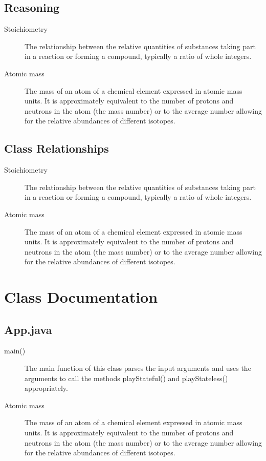 \documentclass{article}
\begin{document}
\subsection{Reasoning}
\label{Reasoning}
\begin{description}
\item[Stoichiometry]
The relationship between the relative quantities of substances taking part in a reaction or forming a compound, typically a ratio of whole integers.
\item[Atomic mass]
The mass of an atom of a chemical element expressed in atomic mass units. It is approximately equivalent to the number of protons and neutrons in the atom (the mass number) or to the average number allowing for the relative abundances of different isotopes. 
\end{description} 


\subsection{Class Relationships}
\label{Class Relationships}
\begin{description}
\item[Stoichiometry]
The relationship between the relative quantities of substances taking part in a reaction or forming a compound, typically a ratio of whole integers.
\item[Atomic mass]
The mass of an atom of a chemical element expressed in atomic mass units. It is approximately equivalent to the number of protons and neutrons in the atom (the mass number) or to the average number allowing for the relative abundances of different isotopes. 
\end{description} 
 
 \pagebreak

\section{Class Documentation}

\subsection{App.java}
\label{definitions}
\begin{description}
\item[main()]
The main function of this class parses the input arguments and uses the arguments to call the methods playStateful() and playStateless() appropriately.
\item[Atomic mass]
The mass of an atom of a chemical element expressed in atomic mass units. It is approximately equivalent to the number of protons and neutrons in the atom (the mass number) or to the average number allowing for the relative abundances of different isotopes. 
\end{description} 
\end{document}
